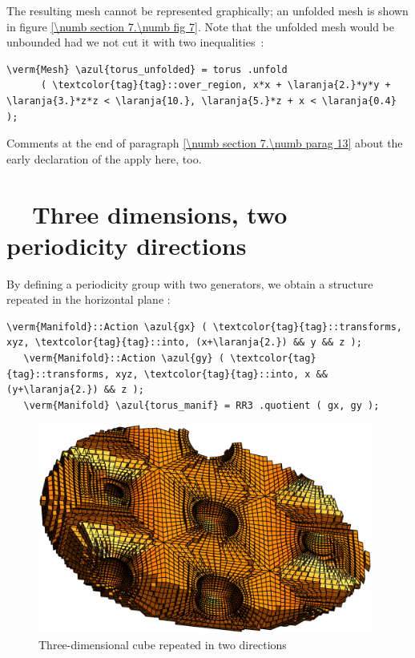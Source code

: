 The resulting mesh cannot be represented graphically; an unfolded mesh is shown in
figure \ref{\numb section 7.\numb fig 7}.
Note that the unfolded mesh would be unbounded had we not cut it with two inequalities~:

\begin{Verbatim}[commandchars=\\\{\},formatcom=\small\tt,frame=single,
   label=parag-\ref{\numb section 7.\numb parag 11}.cpp,rulecolor=\color{moldura},
   baselinestretch=0.94,framesep=2mm                                             ]
   \verm{Mesh} \azul{torus_unfolded} = torus .unfold
      ( \textcolor{tag}{tag}::over_region, x*x + \laranja{2.}*y*y + \laranja{3.}*z*z < \laranja{10.}, \laranja{5.}*z + x < \laranja{0.4} );
\end{Verbatim}

Comments at the end of paragraph \ref{\numb section 7.\numb parag 13} about the early declaration of the
{\small\tt{}} {\small\tt{}} apply here, too.


\section{~~Three dimensions, two periodicity directions}\label{\numb section 7.\numb parag 12}

By defining a periodicity group with two generators, we obtain a structure repeated in the
horizontal plane :

\begin{Verbatim}[commandchars=\\\{\},formatcom=\small\tt,frame=single,
   label=parag-\ref{\numb section 7.\numb parag 12}.cpp,rulecolor=\color{moldura},
   baselinestretch=0.94,framesep=2mm                                             ]
   \verm{Manifold}::Action \azul{gx} ( \textcolor{tag}{tag}::transforms, xyz, \textcolor{tag}{tag}::into, (x+\laranja{2.}) && y && z );
   \verm{Manifold}::Action \azul{gy} ( \textcolor{tag}{tag}::transforms, xyz, \textcolor{tag}{tag}::into, x && (y+\laranja{2.}) && z );
   \verm{Manifold} \azul{torus_manif} = RR3 .quotient ( gx, gy );
\end{Verbatim}

\begin{figure}[ht] \centering
  \includegraphics[width=110mm]{torus-of-cubes-2d.eps}
  \caption{Three-dimensional cube repeated in two directions}
  \label{\numb section 7.\numb fig 8}
\end{figure}

